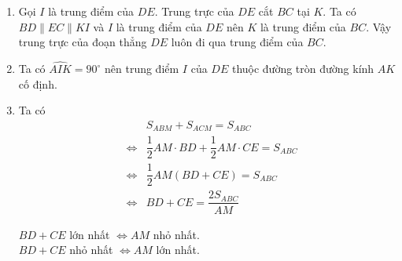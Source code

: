 \begin{bt}
{\begin{enumerate}
{	
			}
			\item  Gọi $I$ là trung điểm của $DE$. Trung trực của $DE$ cắt $BC$ tại $K$. Ta có $BD \parallel EC \parallel KI$ và $I$ là trung điểm của $DE$ nên $K$ là trung điểm của $BC$. Vậy trung trực của đoạn thẳng $DE$ luôn đi qua trung điểm của $BC$.
			\item Ta có $\widehat{AIK} = 90^{\circ}$ nên trung điểm $I$ của $DE$ thuộc đường tròn đường kính $AK$ cố định. 
			\item Ta có
			{\allowdisplaybreaks
				\begin{eqnarray*}
					&	&	S_{ABM} + S_{ACM} = S_{ABC} \\
					&	\Leftrightarrow &\dfrac{1}{2} AM \cdot BD + \dfrac{1}{2} AM \cdot CE = S_{ABC} \\
					&	\Leftrightarrow &\dfrac{1}{2} AM \left( BD + CE \right) = S_{ABC} \\
					&	\Leftrightarrow &BD + CE = \dfrac{2S_{ABC}}{AM}
			\end{eqnarray*}}
			
			$BD + CE$ lớn nhất $\Leftrightarrow AM$ nhỏ nhất. \\
			$BD + CE$ nhỏ nhất $\Leftrightarrow AM$ lớn nhất.
		\end{enumerate}
		
	}
\end{bt}
	
